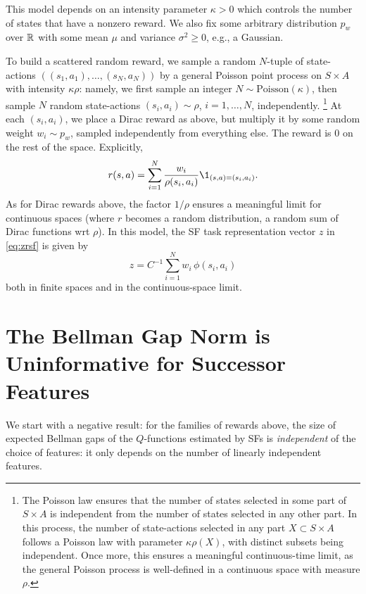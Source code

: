 \documentclass[11pt,a4paper]{article}
\begin{document}
This model depends on an intensity parameter $\kappa>0$ which
controls the number of states that have a nonzero reward. We also fix some
arbitrary distribution $p_w$ over ${\mathbb{R}}$ with some mean
$\mu$ and variance $\sigma^2\geq 0$, e.g., a Gaussian.

To build a scattered random reward, we sample a random
$N$-tuple of state-actions $((s_1,a_1),\ldots,(s_N,a_N))$ by a general
Poisson point process on $S\times A$ with intensity
$\kappa \rho$: namely, we first sample an integer $N\sim
\mathrm{Poisson}(\kappa)$, then sample $N$ random state-actions
$(s_i,a_i)\sim \rho$, $i=1,\ldots, N$, independently.
\footnote{
The Poisson law ensures that the number of states selected in some part
of $S\times A$ is independent from the number of states selected in any other
part.
In this process, the number of state-actions
selected in any part $X\subset S\times A$ follows a Poisson law with
parameter $\kappa \rho(X)$, with distinct subsets being independent.
Once more, this ensures a meaningful continuous-time limit,
as the general Poisson process is well-defined in a continuous space with
measure $\rho$.}
At each $(s_i,a_i)$, we place a
Dirac reward as above, but multiply it by some
random weight $w_i\sim p_w$, sampled independently from everything else. The reward is $0$
on the rest of the space. Explicitly,
\begin{equation}
r(s,a)=\sum_{i=1}^N \frac{w_i}{\rho(s_i,a_i)}
\1_{(s,a)=(s_i,a_i)}.
\end{equation}
As for Dirac rewards above, the factor $1/\rho$ ensures a
meaningful limit for continuous spaces (where $r$ becomes a random
distribution, a random sum of Dirac functions wrt $\rho$). In this model,
the SF task representation vector $z$ in \eqref{eq:zrsf} is given by
\begin{equation}
z=C^{-1}\sum_{i=1}^N w_i\, \phi(s_i,a_i)
\end{equation}
both in finite spaces and in the continuous-space limit.


\section{The Bellman Gap Norm is Uninformative for Successor Features}

We start with a negative result: for the families of rewards above, the
size of expected Bellman gaps of the $Q$-functions estimated by SFs is
\emph{independent} of the choice of features: it only depends on the
number of linearly independent features.
\end{document}
